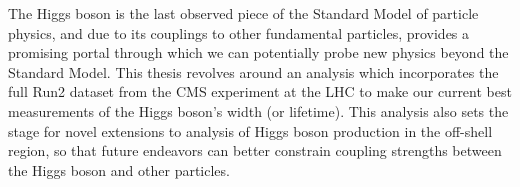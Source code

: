 

The Higgs boson is the last observed piece of the Standard Model of particle physics, and due to its couplings to other fundamental particles, provides a promising portal through which we can potentially probe new physics beyond the Standard Model. This thesis revolves around an analysis which incorporates the full Run2 dataset from the CMS experiment at the LHC to make our current best measurements of the Higgs boson's width (or lifetime). This analysis also sets the stage for novel extensions to analysis of Higgs boson production in the off-shell region, so that future endeavors can better constrain coupling strengths between the Higgs boson and other particles. 



